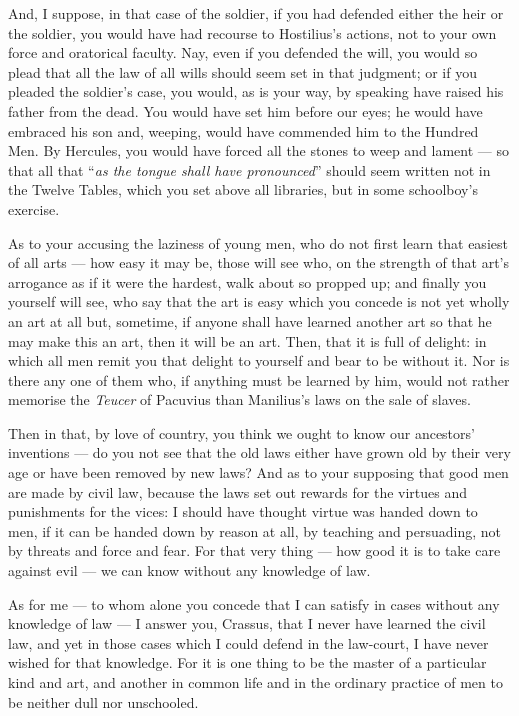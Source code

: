  And, I suppose, in that case of the soldier, if you had defended either the heir or the soldier, you would have had recourse to Hostilius's actions, not to your own force and oratorical faculty. Nay, even if you defended the will, you would so plead that all the law of all wills should seem set in that judgment; or if you pleaded the soldier's case, you would, as is your way, by speaking have raised his father from the dead. You would have set him before our eyes; he would have embraced his son and, weeping, would have commended him to the Hundred Men. By Hercules, you would have forced all the stones to weep and lament — so that all that ``\textit{as the tongue shall have pronounced}'' should seem written not in the Twelve Tables, which you set above all libraries, but in some schoolboy's exercise.

 As to your accusing the laziness of young men, who do not first learn that easiest of all arts — how easy it may be, those will see who, on the strength of that art's arrogance as if it were the hardest, walk about so propped up; and finally you yourself will see, who say that the art is easy which you concede is not yet wholly an art at all but, sometime, if anyone shall have learned another art so that he may make this an art, then it will be an art. Then, that it is full of delight: in which all men remit you that delight to yourself and bear to be without it. Nor is there any one of them who, if anything must be learned by him, would not rather memorise the \textit{Teucer} of Pacuvius than Manilius's laws on the sale of slaves.

 Then in that, by love of country, you think we ought to know our ancestors' inventions — do you not see that the old laws either have grown old by their very age or have been removed by new laws? And as to your supposing that good men are made by civil law, because the laws set out rewards for the virtues and punishments for the vices: I should have thought virtue was handed down to men, if it can be handed down by reason at all, by teaching and persuading, not by threats and force and fear. For that very thing — how good it is to take care against evil — we can know without any knowledge of law.

 As for me — to whom alone you concede that I can satisfy in cases without any knowledge of law — I answer you, Crassus, that I never have learned the civil law, and yet in those cases which I could defend in the law-court, I have never wished for that knowledge. For it is one thing to be the master of a particular kind and art, and another in common life and in the ordinary practice of men to be neither dull nor unschooled.

